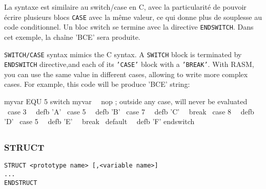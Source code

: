 \begin{xfr}
La syntaxe est similaire au switch/case en C, avec la particularité de pouvoir écrire plusieurs blocs \texttt{CASE} avec la même valeur, ce qui donne plus de souplesse au code conditionnel. Un bloc switch se termine avec la directive \texttt{ENDSWITCH}.
Dans cet exemple, la chaîne 'BCE' sera produite.
\end{xfr}

\begin{xen}
\texttt{SWITCH/CASE} syntax mimics the C syntax.  A \texttt{SWITCH} block is terminated by \texttt{ENDSWITCH} directive,and each of its \texttt{'CASE'} block with a \texttt{'BREAK'}. With RASM, you can use the same value in different cases, allowing to write more complex cases. For example, this code will be produce 'BCE' string:
\end{xen}

\begin{code}
myvar EQU 5
\medskip
switch myvar
\ \ nop 		; outside any case, will never be evaluated
\ case 3
\ \ defb 'A'
\ case 5
\ \ defb 'B'
\ case 7
\ \ defb 'C'
\ \ break
\ case 8
\ \ defb 'D'
\ case 5
\ \ defb 'E'
\ \ break
\ default
\ \ defb 'F'
endswitch
\end{code}


\subsection{}



\subsection{}
  

\subsection{}

\subsubsection{STRUCT}  
\begin{verbatim}
STRUCT <prototype name> [,<variable name>]
...
ENDSTRUCT
\end{verbatim}

